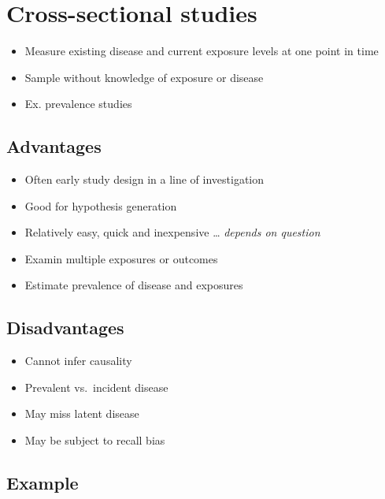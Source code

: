 \documentclass[
]{book}
\providecommand{\tightlist}{%
  \setlength{\itemsep}{0pt}\setlength{\parskip}{0pt}}
\begin{document}
\hypertarget{cross-sectional-studies}{%
\section{Cross-sectional studies}\label{cross-sectional-studies}}

\begin{itemize}
\tightlist
\item
  Measure existing disease and current exposure levels at one point in time
\item
  Sample without knowledge of exposure or disease
\item
  Ex. prevalence studies
\end{itemize}

\hypertarget{advantages}{%
\subsection{Advantages}\label{advantages}}

\begin{itemize}
\tightlist
\item
  Often early study design in a line of investigation
\item
  Good for hypothesis generation
\item
  Relatively easy, quick and inexpensive \ldots{} \emph{depends on question}
\item
  Examin multiple exposures or outcomes
\item
  Estimate prevalence of disease and exposures
\end{itemize}

\hypertarget{disadvantages}{%
\subsection{Disadvantages}\label{disadvantages}}

\begin{itemize}
\tightlist
\item
  Cannot infer causality
\item
  Prevalent vs.~incident disease
\item
  May miss latent disease
\item
  May be subject to recall bias
\end{itemize}

\hypertarget{example-1}{%
\subsection{Example}\label{example-1}}
\end{document}
